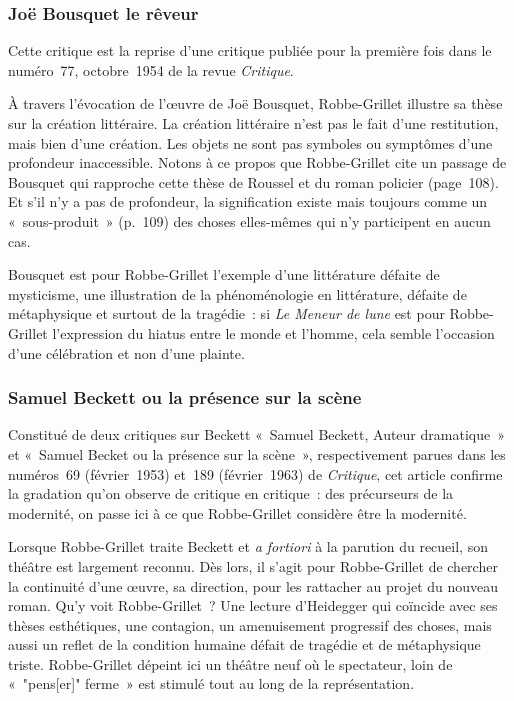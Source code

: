 \subsubsection{Joë Bousquet le rêveur}
Cette critique est la reprise d'une critique publiée pour la première fois dans le numéro~77, octobre~1954 de la revue \textit{Critique}.

À travers l'évocation de l'œuvre de Joë Bousquet, Robbe-Grillet illustre sa thèse sur la création littéraire. La création littéraire n'est pas le fait d'une restitution, mais bien d'une création. Les objets ne sont pas symboles ou symptômes d'une profondeur inaccessible. Notons à ce propos que Robbe-Grillet cite un passage de Bousquet qui rapproche cette thèse de Roussel et du roman policier (page~108). Et s'il n'y a pas de profondeur, la signification existe mais toujours comme un «~sous-produit~» (p.~109) des choses elles-mêmes qui n'y participent en aucun cas.

Bousquet est pour Robbe-Grillet l'exemple d'une littérature défaite de mysticisme, une illustration de la phénoménologie en littérature, défaite de métaphysique et surtout de la tragédie~: si \textit{Le Meneur de lune} est pour Robbe-Grillet l'expression du hiatus entre le monde et l'homme, cela semble l'occasion d'une célébration et non d'une plainte.


\subsubsection{Samuel Beckett ou la présence sur la scène}
Constitué de deux critiques sur Beckett «~Samuel Beckett, Auteur dramatique~» et «~Samuel Becket ou la présence sur la scène~», respectivement parues dans les numéros~69 (février~1953) et~189 (février~1963) de \textit{Critique}, cet article confirme la gradation qu'on observe de critique en critique~: des précurseurs de la modernité, on passe ici à ce que Robbe-Grillet considère être la modernité.

Lorsque Robbe-Grillet traite Beckett et \textit{a fortiori} à la parution du recueil, son théâtre est largement reconnu. Dès lors, il s'agit pour Robbe-Grillet de chercher la continuité d'une œuvre, sa direction, pour les rattacher au projet du nouveau roman. Qu'y voit Robbe-Grillet~? Une lecture d'Heidegger qui coïncide avec ses thèses esthétiques, une contagion, un amenuisement progressif des choses, mais aussi un reflet de la condition humaine défait de tragédie et de métaphysique triste. Robbe-Grillet dépeint ici un théâtre neuf où le spectateur, loin de «~"pens[er]" ferme~» est stimulé tout au long de la représentation.



